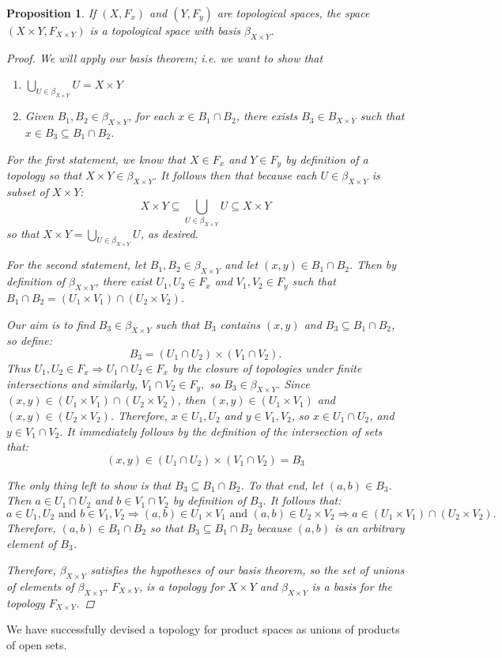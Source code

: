 \documentclass[reqno]{amsart}
\newtheorem{proposition}[theorem]{Proposition}
\begin{document}
\begin{proposition}
If $(X,F_x)$ and $(Y,F_y)$ are topological spaces, the space $(X\times Y,F_{X\times Y})$ is a topological space with basis $\beta_{X\times Y}$.

\begin{proof}
We will apply our basis theorem; i.e. we want to show that
\begin{enumerate}
\item $\bigcup_{U\in \beta_{X\times Y}} U = X \times Y$
\item Given $B_1,B_2\in\beta_{X\times Y}$, for each $x\in B_1\cap B_2$, there exists $B_3\in B_{X\times Y}$ such that $x\in B_3\subseteq B_1\cap B_2$.
\end{enumerate}

For the first statement, we know that $X\in F_x$ and $Y\in F_y$ by definition of a topology so that $X\times Y\in \beta_{X\times Y}$. It follows then that because each $U\in \beta_{X\times Y}$ is  subset of $X\times Y$:
\[X \times Y \subseteq \bigcup_{U\in \beta_{X\times Y}} U \subseteq X\times Y\]
so that $X\times Y = \bigcup_{U\in \beta_{X\times Y}} U$, as desired.

For the second statement, let $B_1,B_2\in \beta_{X\times Y}$ and let $(x,y)\in B_1\cap B_2$. Then by definition of $\beta_{X\times Y}$, there exist $U_1,U_2\in F_x$ and $V_1,V_2\in F_y$ such that $B_1\cap B_2 = (U_1\times V_1)\cap (U_2\times V_2)$. 

Our aim is to find $B_3\in \beta_{X\times Y}$ such that $B_3$ contains $(x,y)$ and $B_3\subseteq B_1\cap B_2$, so define:
\[B_3 = (U_1\cap U_2) \times (V_1\cap V_2).\]
Thus $U_1,U_2\in F_x\Rightarrow U_1\cap U_2\in F_x$ by the closure of topologies under finite intersections and similarly, $V_1\cap V_2\in F_y,$ so $B_3\in \beta_{X\times Y}$.
Since $(x,y)\in (U_1 \times V_1)\cap (U_2\times V_2)$, then $(x,y)\in (U_1\times V_1)$ and $(x,y)\in (U_2\times V_2)$. Therefore, $x\in U_1,U_2$ and $y\in V_1,V_2$, so $x\in U_1\cap U_2$, and $y\in V_1\cap V_2$. It immediately follows by the definition of the intersection of sets that:
\[(x,y) \in (U_1\cap U_2)\times (V_1\cap V_2) = B_3\]

The only thing left to show is that $B_3\subseteq B_1\cap B_2$. To that end, let $(a,b)\in B_3$. Then $a\in U_1\cap U_2$ and $b\in V_1\cap V_2$ by definition of $B_3$. It follows that:
\[a\in U_1,U_2 \text{ and } b\in V_1,V_2 \Rightarrow (a,b)\in U_1\times V_1 \text{ and } (a,b)\in U_2 \times V_2 \Rightarrow a\in (U_1\times V_1)\cap (U_2\times V_2).\]
Therefore, $(a,b)\in B_1\cap B_2$ so that $B_3\subseteq B_1\cap B_2$ because $(a,b)$ is an arbitrary element of $B_3$. 

Therefore, $\beta_{X\times Y}$ satisfies the hypotheses of our basis theorem, so the set of unions of elements of $\beta_{X\times Y}$, $F_{X\times Y}$, is a topology for $X\times Y$ and $\beta_{X\times Y}$ is a basis for the topology $F_{X\times Y}$.
\end{proof}
\end{proposition}
We have successfully devised a topology for product spaces as unions of products of open sets.
\end{document}
